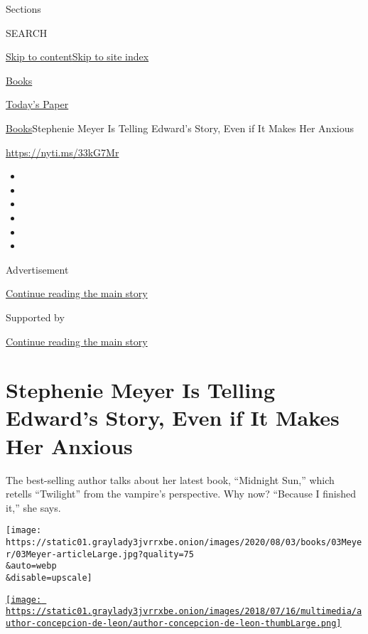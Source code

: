 Sections

SEARCH

\protect\hyperlink{site-content}{Skip to
content}\protect\hyperlink{site-index}{Skip to site index}

\href{https://www.nytimes3xbfgragh.onion/section/books}{Books}

\href{https://myaccount.nytimes3xbfgragh.onion/auth/login?response_type=cookie\&client_id=vi}{}

\href{https://www.nytimes3xbfgragh.onion/section/todayspaper}{Today's
Paper}

\href{/section/books}{Books}\textbar{}Stephenie Meyer Is Telling
Edward's Story, Even if It Makes Her Anxious

\url{https://nyti.ms/33kG7Mr}

\begin{itemize}
\item
\item
\item
\item
\item
\item
\end{itemize}

Advertisement

\protect\hyperlink{after-top}{Continue reading the main story}

Supported by

\protect\hyperlink{after-sponsor}{Continue reading the main story}

\hypertarget{stephenie-meyer-is-telling-edwards-story-even-if-it-makes-her-anxious}{%
\section{Stephenie Meyer Is Telling Edward's Story, Even if It Makes Her
Anxious}\label{stephenie-meyer-is-telling-edwards-story-even-if-it-makes-her-anxious}}

The best-selling author talks about her latest book, ``Midnight Sun,''
which retells ``Twilight'' from the vampire's perspective. Why now?
``Because I finished it,'' she says.

\texttt{[image: https://static01.graylady3jvrrxbe.onion/images/2020/08/03/books/03Meyer/03Meyer-articleLarge.jpg?quality=75\\\&auto=webp\\\&disable=upscale]}

\href{https://www.nytimes3xbfgragh.onion/by/concepcion-de-leon}{\texttt{[image: https://static01.graylady3jvrrxbe.onion/images/2018/07/16/multimedia/author-concepcion-de-leon/author-concepcion-de-leon-thumbLarge.png]}}

